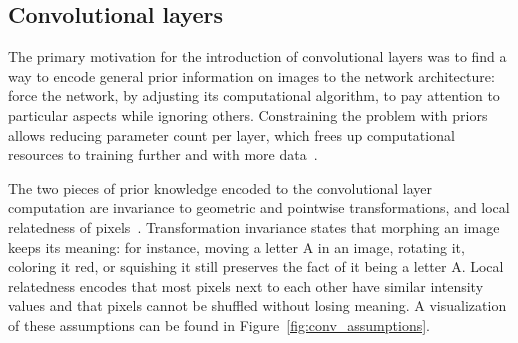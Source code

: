\documentclass[english,twoside,openright]{UH_DS_MSc}
\begin{document}
\subsection{Convolutional layers}

The primary motivation for the introduction of convolutional layers was to find a way to encode general prior information 
on images  to the network architecture: force the network, by adjusting its computational 
algorithm, to pay attention to particular aspects while ignoring others. Constraining the problem with priors allows reducing parameter count per layer, which frees up 
computational resources to training further and with more data~\cite{alexnet}.


The two pieces of prior knowledge encoded to the convolutional layer computation
 are invariance to geometric and pointwise transformations, and local relatedness of pixels~\cite{princebook}.
Transformation invariance states that morphing an image keeps its meaning: for instance,
 moving a letter A in an image, 
rotating it, coloring it red, or squishing it still preserves the fact of it being a letter A. Local relatedness 
encodes that most pixels next to each other have similar intensity values and that pixels cannot be shuffled without losing meaning. A visualization of these assumptions can be found in Figure~\ref{fig:conv_assumptions}.
\end{document}
